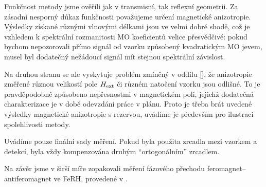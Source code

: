 Funkčnost metody jsme ověřili jak v transmisní, tak reflexní geometrii.
Za zásadní nesporný důkaz funkčnosti považujeme určení magnetické anizotropie.
Výsledky získané různými vlnovými délkami jsou ve velmi dobré shodě, což je vzhledem k spektrální rozmanitosti MO koeficientů velice přesvědčivé: pokud bychom nepozorovali přímo signál od vzorku způsobený kvadratickým MO jevem, musel byl dodatečný nežádoucí signál mít stejnou spektrální závislost.

Na druhou stranu se ale vyskytuje problém zmíněný v oddílu \ref{}, že anizotropie změřené různou velikostí pole $H_\textrm{ext}$ či různém natočení vzorku jsou odlišné.
To je pravděpodobně způsobeno nepřesnostmi v magnetickém poli, jejichž dodatečná charakterizace je v době odevzdání práce v plánu.
Proto je třeba brát uvedené výsledky magnetické anizotropie s rezervou, uvádíme je především pro ilustraci spolehlivosti metody.

Uvádíme pouze finální sady měření.
Pokud byla použita zrcadla mezi vzorkem a detekcí, byla vždy kompenzována druhým ``ortogonálním'' zrcadlem.

Na závěr jsme v širší míře zopakovali měření fázového přechodu feromagnet--antiferomagnet ve FeRH, provedené v \cite{kubascikMagnetooptickeStudiumAntiferomagnetickych2019}.

